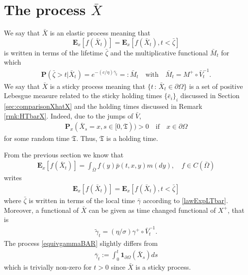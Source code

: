 \documentclass[11pt,a4paper]{article}
\begin{document}
\section{The process $\bar{X}$}
\label{sec:barX}
We say that $\bar{X}$ is an elastic process meaning that 
$$\mathbf{E}_x[f(\bar{X}_t)] = \mathbf{E}_x[f(\bar{X}_t), t < \bar{\zeta}]$$ 
is written in terms of the lifetime $\bar{\zeta}$ and the multiplicative functional $\bar{M}_t$ for which
\begin{align}
\label{lawExpLTbar} 
\mathbf{P}(\bar{\zeta} > t | \bar{X}_t) = e^{-(c/\eta) \bar{\gamma}_t} =: \bar{M}_t \quad \textrm{with} \quad \bar{M}_t = M^+ \circ \bar{V}^{-1}_t.
\end{align}
We say that $\bar{X}$ is a sticky process meaning that $\{t\,:\, \bar{X}_t \in \partial \Omega\}$ is a set of positive Lebesgue measure related to the sticky holding times $\{\bar{e}_i\}_i$ discussed in Section \ref{sec:comparisonXhatX} and the holding times discussed in Remark \ref{rmk:HTbarX}. Indeed, due to the jumps of $\bar{V}$,  
\begin{align*}
\mathbf{P}_x(\bar{X}_s = x, s \in [0,\mathfrak{T}))>0 \quad \textrm{if} \quad x \in \partial \Omega
\end{align*}
for some random time $\mathfrak{T}$. Thus, $\mathfrak{T}$ is a holding time.
 
From the previous section we know that
\begin{align*}
\mathbf{E}_x[f(\bar{X}_t)] = \int_{\bar{\Omega}} f(y) \bar{p}(t,x,y) m(dy), \quad f \in C(\bar{\Omega})
\end{align*}
writes
\begin{align*}
\mathbf{E}_x[f(\bar{X}_t)]= \mathbf{E}_x[f(\bar{X}_t), t < \bar{\zeta}] 
\end{align*}
where $\bar{\zeta}$ is written in terms of the local time $\bar{\gamma}$ according to \eqref{lawExpLTbar}. Moreover, a functional of $\bar{X}$ can be given as time changed functional of $X^+$, that is
\begin{align}
\label{equivgammaBAR} 
\tilde{\gamma}_t = (\eta/\sigma) \gamma^+ \circ \bar{V}^{-1}_t.
\end{align}
The process \eqref{equivgammaBAR} slightly differs from
\begin{align*}
\bar{\gamma}_t := \int_0^t \mathbf{1}_{\partial \Omega} (\bar{X}_s) ds 
\end{align*} 
which is trivially non-zero for $t>0$ since $\bar{X}$ is a sticky process.\\
\end{document}
